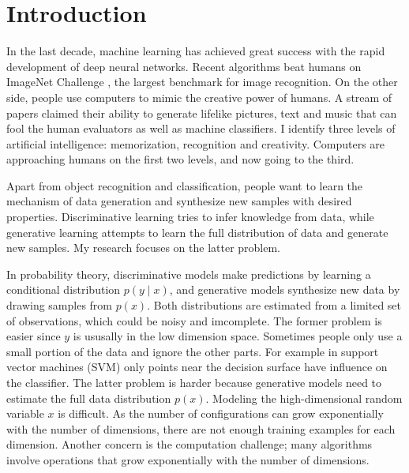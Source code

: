 \documentclass{article}
\begin{document}
\section{Introduction}
\label{Sec:Intro}

In the last decade, machine learning has achieved great success with the rapid development of deep neural networks. Recent algorithms beat humans on ImageNet Challenge \cite{5206848}, the largest benchmark for image recognition. On the other side, people use computers to mimic the creative power of humans. A stream of papers \cite{DBLP:journals/corr/abs-1710-10196, DBLP:conf/aaai/DongHYY18, DBLP:journals/corr/abs-1711-09020, DBLP:journals/corr/abs-1808-08703, DBLP:journals/corr/abs-1805-07848} claimed their ability to generate lifelike pictures, text and music that can fool the human evaluators as well as machine classifiers. I identify three levels of artificial intelligence: memorization, recognition and creativity. Computers are approaching humans on the first two levels, and now going to the third.

Apart from object recognition and classification, people want to learn the mechanism of data generation and synthesize new samples with desired properties. Discriminative learning tries to infer knowledge from data, while generative learning attempts to learn the full distribution of data and generate new samples. My research focuses on the latter problem.

In probability theory, discriminative models make predictions by learning a conditional distribution $p(y\mid x)$, and generative models synthesize new data by drawing samples from $p(x)$. Both distributions are estimated from a limited set of observations, which could be noisy and imcomplete. The former problem is easier since $y$ is ususally in the low dimension space. Sometimes people only use a small portion of the data and ignore the other parts. For example in support vector machines (SVM) only points near the decision surface have influence on the classifier. The latter problem is harder because generative models need to estimate the full data distribution $p(x)$. Modeling the high-dimensional random variable $x$ is difficult. As the number of configurations can grow exponentially with the number of dimensions, there are not enough training examples for each dimension. Another concern is the computation challenge; many algorithms involve operations that grow exponentially with the number of dimensions.
\end{document}
